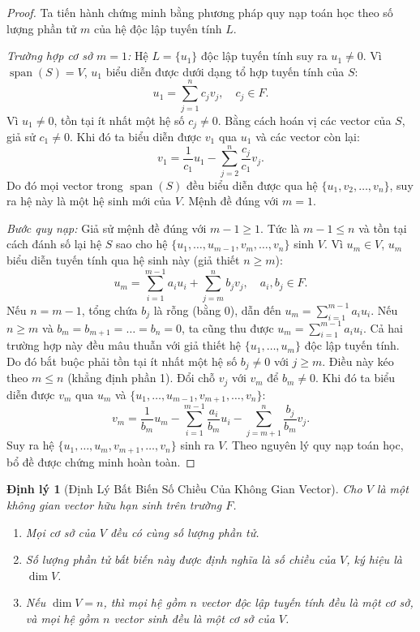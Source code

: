 \documentclass{article}
\newtheorem{dinhly}{Định lý}
\begin{document}
\begin{proof}
Ta tiến hành chứng minh bằng phương pháp quy nạp toán học theo số lượng phần tử $m$ của hệ độc lập tuyến tính $L$.

\emph{Trường hợp cơ sở $m = 1$:} Hệ $L = \{u_1\}$ độc lập tuyến tính suy ra $u_1 \ne 0$.
Vì $\operatorname{span}(S) = V$, $u_1$ biểu diễn được dưới dạng tổ hợp tuyến tính của $S$:
\begin{equation}
    u_1 = \sum_{j=1}^n c_j v_j, \quad c_j \in F.
\end{equation}
Vì $u_1 \ne 0$, tồn tại ít nhất một hệ số $c_j \ne 0$. Bằng cách hoán vị các vector của $S$, giả sử $c_1 \ne 0$.
Khi đó ta biểu diễn được $v_1$ qua $u_1$ và các vector còn lại:
\begin{equation}
    v_1 = \frac{1}{c_1} u_1 - \sum_{j=2}^n \frac{c_j}{c_1} v_j.
\end{equation}
Do đó mọi vector trong $\operatorname{span}(S)$ đều biểu diễn được qua hệ $\{u_1, v_2, \dots, v_n\}$, suy ra hệ này là một hệ sinh mới của $V$. Mệnh đề đúng với $m = 1$.

\emph{Bước quy nạp:} Giả sử mệnh đề đúng với $m - 1 \ge 1$. Tức là $m - 1 \le n$ và tồn tại cách đánh số lại hệ $S$ sao cho hệ $\{u_1, \dots, u_{m-1}, v_m, \dots, v_n\}$ sinh $V$.
Vì $u_m \in V$, $u_m$ biểu diễn tuyến tính qua hệ sinh này (giả thiết $n \ge m$):
\begin{equation}
    u_m = \sum_{i=1}^{m-1} a_i u_i + \sum_{j=m}^n b_j v_j, \quad a_i, b_j \in F.
\end{equation}
Nếu $n = m - 1$, tổng chứa $b_j$ là rỗng (bằng 0), dẫn đến $u_m = \sum_{i=1}^{m-1} a_i u_i$. Nếu $n \ge m$ và $b_m = b_{m+1} = \dots = b_n = 0$, ta cũng thu được $u_m = \sum_{i=1}^{m-1} a_i u_i$. Cả hai trường hợp này đều mâu thuẫn với giả thiết hệ $\{u_1, \dots, u_m\}$ độc lập tuyến tính.
Do đó bắt buộc phải tồn tại ít nhất một hệ số $b_j \ne 0$ với $j \ge m$.
Điều này kéo theo $m \le n$ (khẳng định phần 1).
Đổi chỗ $v_j$ với $v_m$ để $b_m \ne 0$. Khi đó ta biểu diễn được $v_m$ qua $u_m$ và $\{u_1, \dots, u_{m-1}, v_{m+1}, \dots, v_n\}$:
\begin{equation}
    v_m = \frac{1}{b_m} u_m - \sum_{i=1}^{m-1} \frac{a_i}{b_m} u_i - \sum_{j=m+1}^n \frac{b_j}{b_m} v_j.
\end{equation}
Suy ra hệ $\{u_1, \dots, u_m, v_{m+1}, \dots, v_n\}$ sinh ra $V$. Theo nguyên lý quy nạp toán học, bổ đề được chứng minh hoàn toàn.
\end{proof}

\begin{dinhly}[Định Lý Bất Biến Số Chiều Của Không Gian Vector]
Cho $V$ là một không gian vector hữu hạn sinh trên trường $F$.
\begin{enumerate}
    \item Mọi cơ sở của $V$ đều có cùng số lượng phần tử.
    \item Số lượng phần tử bất biến này được định nghĩa là số chiều của $V$, ký hiệu là $\dim V$.
    \item Nếu $\dim V = n$, thì mọi hệ gồm $n$ vector độc lập tuyến tính đều là một cơ sở, và mọi hệ gồm $n$ vector sinh đều là một cơ sở của $V$.
\end{enumerate}
\end{dinhly}
\end{document}
